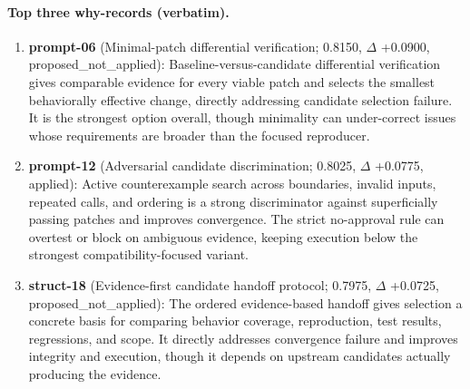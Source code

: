 \paragraph{Top three why-records (verbatim).}\begin{enumerate}\itemsep1pt
\item \textbf{prompt-06} (Minimal-patch differential verification; 0.8150, $\Delta$ +0.0900, proposed\_not\_applied): Baseline-versus-candidate differential verification gives comparable evidence for every viable patch and selects the smallest behaviorally effective change, directly addressing candidate selection failure. It is the strongest option overall, though minimality can under-correct issues whose requirements are broader than the focused reproducer.
\item \textbf{prompt-12} (Adversarial candidate discrimination; 0.8025, $\Delta$ +0.0775, applied): Active counterexample search across boundaries, invalid inputs, repeated calls, and ordering is a strong discriminator against superficially passing patches and improves convergence. The strict no-approval rule can overtest or block on ambiguous evidence, keeping execution below the strongest compatibility-focused variant.
\item \textbf{struct-18} (Evidence-first candidate handoff protocol; 0.7975, $\Delta$ +0.0725, proposed\_not\_applied): The ordered evidence-based handoff gives selection a concrete basis for comparing behavior coverage, reproduction, test results, regressions, and scope. It directly addresses convergence failure and improves integrity and execution, though it depends on upstream candidates actually producing the evidence.
\end{enumerate}
